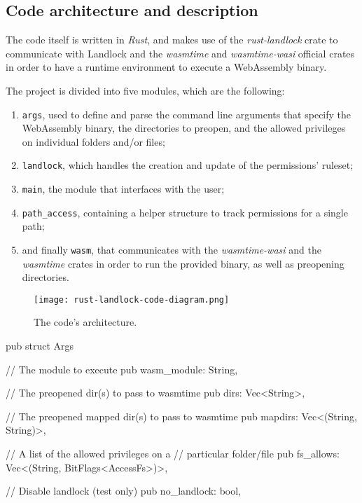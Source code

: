 \subsection{Code architecture and description}\label{sec:landlock-code-architecture}

The code itself is written in \textit{Rust}, and makes use of the
\textit{rust-landlock} \cite{rust-landlock} crate
to communicate with Landlock and the \textit{wasmtime} and \textit{wasmtime-wasi} official
crates in order to have a runtime environment to execute a WebAssembly binary.

The project is divided into five modules, which are the following:
\begin{enumerate}
  \item \texttt{args}, used to define and parse the command line arguments that specify the WebAssembly binary,
        the directories to preopen, and the allowed privileges on individual folders and/or files;
  \item \texttt{landlock}, which handles the creation and update of the permissions' ruleset;
  \item \texttt{main}, the module that interfaces with the user;
  \item \texttt{path\_access}, containing a helper structure to track permissions for a single path;
  \item and finally \texttt{wasm}, that communicates with the \textit{wasmtime-wasi} and the \textit{wasmtime} crates
        in order to run the provided binary, as well as preopening directories.
\end{enumerate}

\begin{figure}[ht]
  \centering
  \texttt{[image: rust-landlock-code-diagram.png]}
  \caption{The code's architecture.}
  \label{fig:rust-landlock-code-architecture}
\end{figure}

\begin{code}[language=rust, caption=The \texttt{Args} struct., label=lst:arg-struct]
pub struct Args {
  // The module to execute
  pub wasm_module: String,

  // The preopened dir(s) to pass to wasmtime
  pub dirs: Vec<String>,

  // The preopened mapped dir(s) to pass to wasmtime
  pub mapdirs: Vec<(String, String)>,

  // A list of the allowed privileges on a
  // particular folder/file
  pub fs_allows: Vec<(String, BitFlags<AccessFs>)>,

  // Disable landlock (test only)
  pub no_landlock: bool,
}
\end{code}


